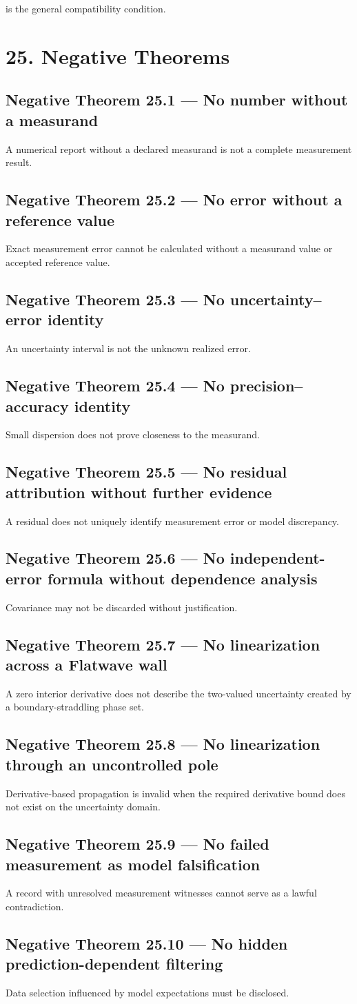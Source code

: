 \documentclass[11pt,oneside,openany]{book}
\newcommand{\PCsection}[1]{%
  \section*{#1}\addcontentsline{toc}{section}{#1}%
}
\newcommand{\PCsubsection}[1]{%
  \subsection*{#1}%
}
\begin{document}
is the general compatibility condition.


\PCsection{25. Negative Theorems}

\PCsubsection{Negative Theorem 25.1 --- No number without a measurand}

A numerical report without a declared measurand is not a complete measurement result.

\PCsubsection{Negative Theorem 25.2 --- No error without a reference value}

Exact measurement error cannot be calculated without a measurand value or accepted reference value.

\PCsubsection{Negative Theorem 25.3 --- No uncertainty–error identity}

An uncertainty interval is not the unknown realized error.

\PCsubsection{Negative Theorem 25.4 --- No precision–accuracy identity}

Small dispersion does not prove closeness to the measurand.

\PCsubsection{Negative Theorem 25.5 --- No residual attribution without further evidence}

A residual does not uniquely identify measurement error or model discrepancy.

\PCsubsection{Negative Theorem 25.6 --- No independent-error formula without dependence analysis}

Covariance may not be discarded without justification.

\PCsubsection{Negative Theorem 25.7 --- No linearization across a Flatwave wall}

A zero interior derivative does not describe the two-valued uncertainty created by a boundary-straddling phase set.

\PCsubsection{Negative Theorem 25.8 --- No linearization through an uncontrolled pole}

Derivative-based propagation is invalid when the required derivative bound does not exist on the uncertainty domain.

\PCsubsection{Negative Theorem 25.9 --- No failed measurement as model falsification}

A record with unresolved measurement witnesses cannot serve as a lawful contradiction.

\PCsubsection{Negative Theorem 25.10 --- No hidden prediction-dependent filtering}

Data selection influenced by model expectations must be disclosed.
\end{document}
